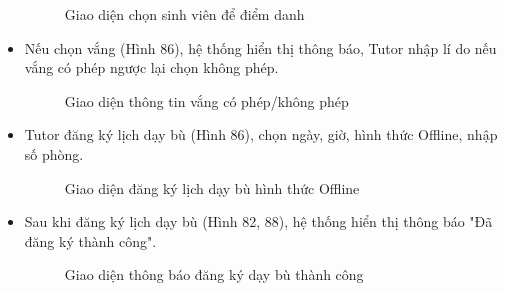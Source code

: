 \begin{itemize}
    \begin{figure}[H]
    \centering
    \setlength{\fboxsep}{2pt}     
    \setlength{\fboxrule}{0.5pt}   
    \caption{Giao diện chọn sinh viên để điểm danh}
    \end{figure}
    \item Nếu chọn vắng (Hình 86), hệ thống hiển thị thông báo, Tutor nhập lí do nếu vắng có phép ngược lại chọn không phép.
    \begin{figure}[H]
    \centering
    \setlength{\fboxsep}{2pt}     
    \setlength{\fboxrule}{0.5pt}   
    \caption{Giao diện thông tin vắng có phép/không phép}
    \end{figure}
    \item Tutor đăng ký lịch dạy bù (Hình 86), chọn ngày, giờ, hình thức Offline, nhập số phòng. 
    \begin{figure}[H]
    \centering
    \setlength{\fboxsep}{2pt}     
    \setlength{\fboxrule}{0.5pt}   
    \caption{Giao diện đăng ký lịch dạy bù hình thức Offline}
    \end{figure}
    \item Sau khi đăng ký lịch dạy bù (Hình 82, 88), hệ thống hiển thị thông báo "Đã đăng ký thành công".
    \begin{figure}[H]
    \centering
    \setlength{\fboxsep}{2pt}     
    \setlength{\fboxrule}{0.5pt}   
    \caption{Giao diện thông báo đăng ký dạy bù thành công}
    \end{figure}
\end{itemize}
